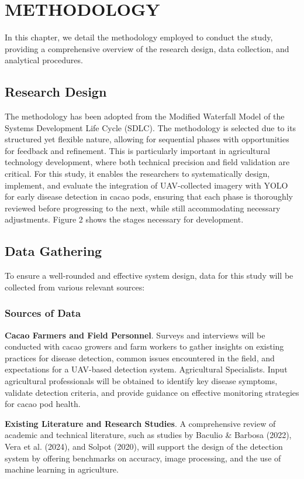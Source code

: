 \chapter{METHODOLOGY}

	In this chapter, we detail the methodology employed to conduct the study, providing a comprehensive overview of the research design, data collection, and analytical procedures.
	
	\section{Research Design}
	The methodology has been adopted from the Modified Waterfall Model of the Systems Development Life Cycle (SDLC). The methodology is selected due to its structured yet flexible nature, allowing for sequential phases with opportunities for feedback and refinement. This is particularly important in agricultural technology development, where both technical precision and field validation are critical. For this study, it enables the researchers to systematically design, implement, and evaluate the integration of UAV-collected imagery with YOLO for early disease detection in cacao pods, ensuring that each phase is thoroughly reviewed before progressing to the next, while still accommodating necessary adjustments. Figure 2 shows the stages necessary for development.
	
	\section{Data Gathering}
	To ensure a well-rounded and effective system design, data for this study will be collected from various relevant sources:
	\subsection{Sources of Data}
	\textbf{Cacao Farmers and Field Personnel}. Surveys and interviews will be conducted with cacao growers and farm workers to gather insights on existing practices for disease detection, common issues encountered in the field, and expectations for a UAV-based detection system. Agricultural Specialists. Input agricultural professionals will be obtained to identify key disease symptoms, validate detection criteria, and provide guidance on effective monitoring strategies for cacao pod health. 
	
	\textbf{Existing Literature and Research Studies}. A comprehensive review of academic and technical literature, such as studies by Baculio \& Barbosa (2022), Vera et al. (2024), and Solpot (2020), will support the design of the detection system by offering benchmarks on accuracy, image processing, and the use of machine learning in agriculture. 
	
